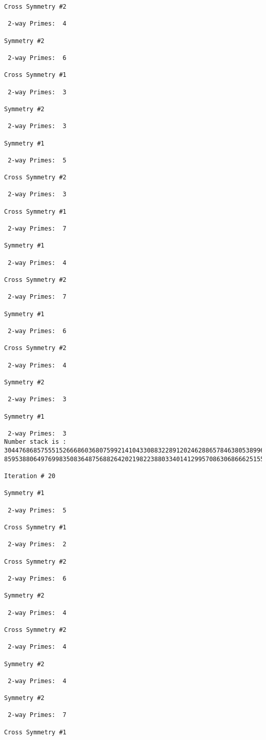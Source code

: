 {{{{\begin{verbatim}
Cross Symmetry #2

 2-way Primes: 	4

Symmetry #2

 2-way Primes: 	6

Cross Symmetry #1

 2-way Primes: 	3

Symmetry #2

 2-way Primes: 	3

Symmetry #1

 2-way Primes: 	5

Cross Symmetry #2

 2-way Primes: 	3

Cross Symmetry #1

 2-way Primes: 	7

Symmetry #1

 2-way Primes: 	4

Cross Symmetry #2

 2-way Primes: 	7

Symmetry #1

 2-way Primes: 	6

Cross Symmetry #2

 2-way Primes: 	4

Symmetry #2

 2-way Primes: 	3

Symmetry #1

 2-way Primes: 	3
Number stack is :
30447686857555152666860368075992141043308832289120246288657846380538996794608835958544046240163340857
85953880649769983508364875688264202198223880334014129957086306866625155575868674403758043361042640445

Iteration #	20

Symmetry #1

 2-way Primes: 	5

Cross Symmetry #1

 2-way Primes: 	2

Cross Symmetry #2

 2-way Primes: 	6

Symmetry #2

 2-way Primes: 	4

Cross Symmetry #2

 2-way Primes: 	4

Symmetry #2

 2-way Primes: 	4

Symmetry #2

 2-way Primes: 	7

Cross Symmetry #1


\end{verbatim}}}}}
